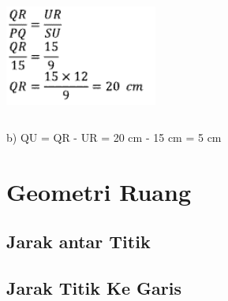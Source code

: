 \documentclass[11pt,fleqn]{book} %
\begin{document}
\includegraphics[width = 5cm, height= 4cm]{Pictures/a37.png}

b) QU = QR - UR = 20 cm - 15 cm = 5 cm






\chapter{Geometri Ruang}
\section{Jarak antar Titik}

\section{Jarak Titik Ke Garis}
\end{document}
